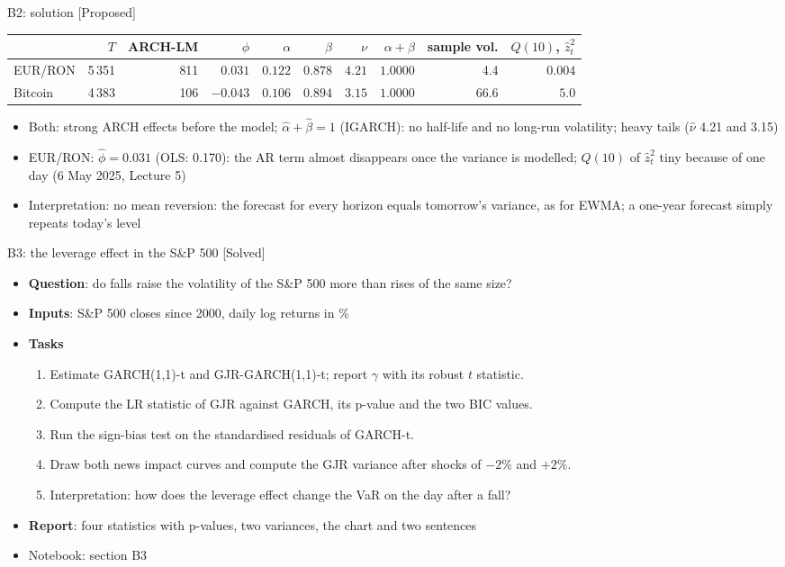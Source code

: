 \ifsolutions
\begin{frame}{B2: solution [Proposed]}
\itemsize{\footnotesize}
\begin{center}
\scriptsize
\begin{tabular}{lrrrrrrrrr}
\toprule
& $T$ & ARCH-LM & $\phi$ & $\alpha$ & $\beta$ & $\nu$ & $\alpha + \beta$ & sample vol. & $Q(10)$, $\hat z_t^2$ \\
\midrule
EUR/RON & 5\,351 & 811 & $0.031$ & $0.122$ & $0.878$ & $4.21$ & $1.0000$ & 4.4 & $0.004$ \\
Bitcoin & 4\,383 & 106 & $-0.043$ & $0.106$ & $0.894$ & $3.15$ & $1.0000$ & 66.6 & $5.0$ \\
\bottomrule
\end{tabular}
\end{center}
\begin{itemize}
    \item Both: strong ARCH effects before the model; $\hat\alpha + \hat\beta = 1$ (IGARCH): no half-life and no long-run volatility; heavy tails ($\hat\nu$ 4.21 and 3.15)
    \item EUR/RON: $\hat\phi = 0.031$ (OLS: 0.170): the AR term almost disappears once the variance is modelled; $Q(10)$ of $\hat z_t^2$ tiny because of one day (6 May 2025, Lecture 5)
    \item Interpretation: no mean reversion: the forecast for every horizon equals tomorrow's variance, as for EWMA; a one-year forecast simply repeats today's level
\end{itemize}
\end{frame}
\fi

\begin{frame}{B3: the leverage effect in the S\&P 500 [Solved]}
\itemsize{\footnotesize}
\begin{itemize}
\item \textbf{Question}: do falls raise the volatility of the S\&P 500 more than rises of the same size?
\item \textbf{Inputs}: S\&P 500 closes since 2000, daily log returns in \%
\item \textbf{Tasks}
\begin{enumerate}
    \item Estimate GARCH(1,1)-t and GJR-GARCH(1,1)-t; report $\gamma$ with its robust $t$ statistic.
    \item Compute the LR statistic of GJR against GARCH, its p-value and the two BIC values.
    \item Run the sign-bias test on the standardised residuals of GARCH-t.
    \item Draw both news impact curves and compute the GJR variance after shocks of $-2\%$ and $+2\%$.
    \item Interpretation: how does the leverage effect change the VaR on the day after a fall?
\end{enumerate}
\item \textbf{Report}: four statistics with p-values, two variances, the chart and two sentences
\item Notebook: section B3
\end{itemize}
\end{frame}

